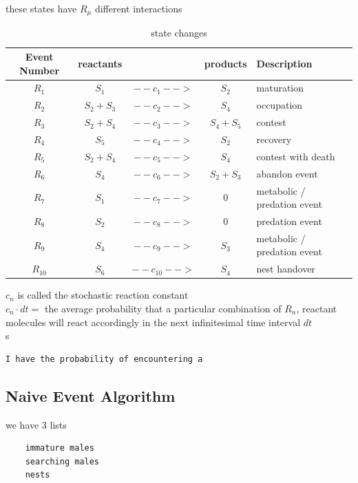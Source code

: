 \documentclass[a4paper,11pt]{article}
\begin{document}
these states have $R_\mu$ different interactions
\begin{table}[h!]
    \caption{state changes}
    \centering
    \begin{tabular}{c | c | c | c | l }
        \hline
            Event Number & reactants  & & products & Description\\
        \hline
        \hline
            $R_1$       &   $S_1$       & $--c_1-->$      &   $ S_2$      & maturation\\
            $R_2$       &   $S_2 + S_3$ & $--c_2-->$      &   $S_4 $      & occupation\\
            $R_3$       &   $S_2 + S_4$ & $--c_3-->$      &   $S_4 + S_5$ & contest\\
            $R_4$       &   $S_5$       & $--c_4-->$      &   $S_2$       & recovery\\
            $R_5$       &   $S_2 + S_4$ & $--c_5-->$      &   $S_4$       & contest with death\\
            $R_6$       &   $S_4$       & $--c_6-->$      &   $S_2 + S_3$ & abandon event\\
            $R_7$       &   $S_1$       & $--c_7-->$      &   $0$         & metabolic / predation event\\
            $R_8$       &   $S_2$       & $--c_8-->$      &   $0$         & predation event\\
            $R_9$       &   $S_4$       & $--c_9-->$      &   $S_3$       & metabolic / predation event\\
            $R_{10}$    &   $S_6$       & $--c_{10}-->$   &   $S_4$       & nest handover\\
        \hline
    \end{tabular}

\end{table}

$c_n$ is called the stochastic reaction constant\\
$c_n \cdot dt = $ the average probability that a particular combination of $R_n$, reactant molecules will react accordingly in the next infinitesimal time interval $dt$\\
s
\begin{verbatim}
I have the probability of encountering a   
\end{verbatim}

\citep{Gillespie-1976}


\clearpage
\subsection{Naive Event Algorithm}
we have 3 lists
\begin{verbatim}
    immature males
    searching males
    nests
\end{verbatim}
\end{document}
